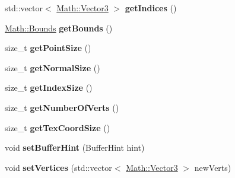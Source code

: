 \begin{DoxyCompactItemize}
\item 
\hypertarget{classBrickware_1_1Graphics_1_1Mesh_a5e51448b4ce86f7a4ffb5ab451d01951}{}std\+::vector$<$ \hyperlink{classBrickware_1_1Math_1_1Vector3}{Math\+::\+Vector3} $>$ {\bfseries get\+Indices} ()\label{classBrickware_1_1Graphics_1_1Mesh_a5e51448b4ce86f7a4ffb5ab451d01951}

\item 
\hypertarget{classBrickware_1_1Graphics_1_1Mesh_a47a9eaefec45f8c5d747b54ee7e4e25d}{}\hyperlink{classBrickware_1_1Math_1_1Bounds}{Math\+::\+Bounds} {\bfseries get\+Bounds} ()\label{classBrickware_1_1Graphics_1_1Mesh_a47a9eaefec45f8c5d747b54ee7e4e25d}

\item 
\hypertarget{classBrickware_1_1Graphics_1_1Mesh_abb53b4c8e3901853bcc4a227430c6a8f}{}size\+\_\+t {\bfseries get\+Point\+Size} ()\label{classBrickware_1_1Graphics_1_1Mesh_abb53b4c8e3901853bcc4a227430c6a8f}

\item 
\hypertarget{classBrickware_1_1Graphics_1_1Mesh_ac2593043892c3c22f1e0090f09e3f1dc}{}size\+\_\+t {\bfseries get\+Normal\+Size} ()\label{classBrickware_1_1Graphics_1_1Mesh_ac2593043892c3c22f1e0090f09e3f1dc}

\item 
\hypertarget{classBrickware_1_1Graphics_1_1Mesh_a11079f12ea58749efc818ca1fbb2fe19}{}size\+\_\+t {\bfseries get\+Index\+Size} ()\label{classBrickware_1_1Graphics_1_1Mesh_a11079f12ea58749efc818ca1fbb2fe19}

\item 
\hypertarget{classBrickware_1_1Graphics_1_1Mesh_a71441e8dc4a7b62391f49bc162dc9661}{}size\+\_\+t {\bfseries get\+Number\+Of\+Verts} ()\label{classBrickware_1_1Graphics_1_1Mesh_a71441e8dc4a7b62391f49bc162dc9661}

\item 
\hypertarget{classBrickware_1_1Graphics_1_1Mesh_a63dc69986a97a060c0acc6f6b0fa4fbb}{}size\+\_\+t {\bfseries get\+Tex\+Coord\+Size} ()\label{classBrickware_1_1Graphics_1_1Mesh_a63dc69986a97a060c0acc6f6b0fa4fbb}

\item 
\hypertarget{classBrickware_1_1Graphics_1_1Mesh_a4531b0ba9fe1ebad4e2a4774c0c89f8f}{}void {\bfseries set\+Buffer\+Hint} (Buffer\+Hint hint)\label{classBrickware_1_1Graphics_1_1Mesh_a4531b0ba9fe1ebad4e2a4774c0c89f8f}

\item 
\hypertarget{classBrickware_1_1Graphics_1_1Mesh_a552cf7b26eb71566f5551ddf4fa387b8}{}void {\bfseries set\+Vertices} (std\+::vector$<$ \hyperlink{classBrickware_1_1Math_1_1Vector3}{Math\+::\+Vector3} $>$ new\+Verts)\label{classBrickware_1_1Graphics_1_1Mesh_a552cf7b26eb71566f5551ddf4fa387b8}


\end{DoxyCompactItemize}
